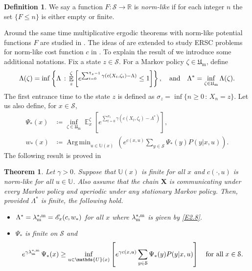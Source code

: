\documentclass[notitlepage,11pt,reqno]{amsart}
\numberwithin{equation}{section}
\theoremstyle{plain}
\newtheorem{theorem}{Theorem}[section]
\theoremstyle{definition}
\newtheorem{definition}{Definition}[section]
\theoremstyle{remark}
\newcommand{\Act}{{\mathds{U}}}
\newcommand{\uuptau}{{\Breve{\uptau}}}
\newcommand{\sE}{{\mathscr{E}}}     %
\newcommand{\cS}{{\mathcal{S}}}     %
\newcommand{\Um}{\mathfrak{U}_{\mathrm{m}}}
\newcommand{\RR}{\mathds{R}} %
\DeclareMathOperator{\Exp}{\mathbb{E}} %
\DeclareMathOperator*{\Argmin}{Arg\,min}
\newcommand{\df}{\coloneqq}
\begin{document}
\begin{definition}
We say a function $F:\cS\to \RR$ is {\it norm-like} if for each integer $n$ the set $\{F\leq n\}$ is either empty or finite. 
\end{definition}
Around the same time multiplicative ergodic theorems with norm-like potential functions $F$ are studied in \cite{MR1787128}. The ideas of \cite{MR1787128} are extended to 
study ERSC problems for norm-like cost function $c$ in \cite{MR1886226}. To explain the result of \cite{MR1886226} we introduce some additional notations. Fix a state $z\in\cS$. For
a Markov policy $\zeta\in \Um$, define
\begin{equation}\label{A01}
\Lambda(\zeta)=\inf\left\{\Lambda\, :\, \Exp_z^\zeta\left[e^{\sum_{t=0}^{\uuptau_z-1} \gamma(c(X_t, \zeta_t)-\Lambda)}\leq 1\right]\right\},
\quad \text{and}\quad \Lambda^*= \inf_{\zeta\in\Um}\Lambda(\zeta).
\end{equation}
The first entrance time to the state $z$ is defined as $\sigma_z=\inf\{n\geq 0\, :\, X_n=z\}$. Let us also define, for $x\in\cS$,
\begin{align*}
\Psi_*(x)&\df\inf_{\zeta\in\Um} \Exp_x^\zeta\left[e^{\sum_{t=0}^{\sigma_z}\gamma(c(X_t, \zeta_t)-\Lambda^*)}\right],
\\
w_*(x)&\df\Argmin_{u\in\Act(x)}\, \left(e^{c(x, u)}\sum_{y\in\cS} \Psi_*(y) P(y|x, u)\right).
\end{align*}
The following result is proved in \cite[Theorem~3.6]{MR1886226}
\begin{theorem}\label{T2.5}
Let $\gamma>0$.
Suppose that $\Act(x)$ is finite for all $x$ and $c(\cdot, u)$ is norm-like for all $u\in\Act$. Also assume that the chain $\textbf{X}$ is communicating under every Markov policy and 
aperiodic under any stationary Markov policy. Then, provided $\Lambda^*$ is finite, the following hold.
\begin{itemize}
\item[(i)] $\Lambda^*=\lambda^{*,{\rm m}}_{\rm m}=\sE_x(c, w_*)$ for all $x$ where $\lambda^{*,{\rm m}}_{\rm m}$ is given by \eqref{E2.8}.
\item[(i)] $\Psi_*$ is finite on $\cS$ and 
\begin{equation*}
e^{\gamma\lambda^{*,{\rm m}}_{\rm m}}\, \Psi_*(x)\geq \inf_{u\in\Act(x)} \left[e^{\gamma c(x, u)} \sum_{y\in\cS} \Psi_*(y) P(y|x, u)\right]\quad \text{for all}\; x\in \cS.
\end{equation*}
\end{itemize}
\end{theorem}
\end{document}
